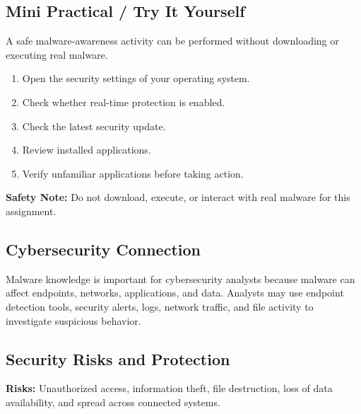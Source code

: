 \documentclass[12pt,a4paper]{article}
\begin{document}

\subsection{Mini Practical / Try It Yourself}

A safe malware-awareness activity can be performed without downloading or executing real malware.

\begin{enumerate}
    \item Open the security settings of your operating system.
    \item Check whether real-time protection is enabled.
    \item Check the latest security update.
    \item Review installed applications.
    \item Verify unfamiliar applications before taking action.
\end{enumerate}

\textbf{Safety Note:} Do not download, execute, or interact with real malware for this assignment.


\subsection{Cybersecurity Connection}

Malware knowledge is important for cybersecurity analysts because malware can affect endpoints, networks, applications, and data. Analysts may use endpoint detection tools, security alerts, logs, network traffic, and file activity to investigate suspicious behavior.


\subsection{Security Risks and Protection}

\textbf{Risks:} Unauthorized access, information theft, file destruction, loss of data availability, and spread across connected systems.
\end{document}
